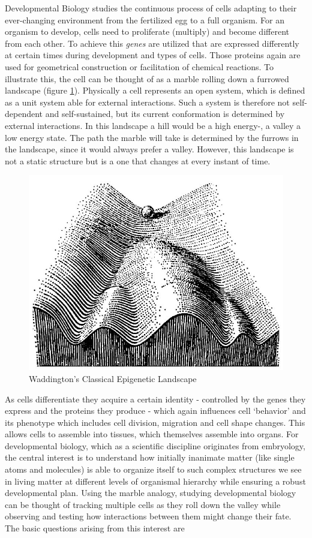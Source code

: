 \documentclass[11pt,singlespacinge,twoside]{reedthesis} %
\theoremstyle{definition}
\theoremstyle{definition}
\theoremstyle{definition}
\theoremstyle{remark}
\begin{document}
Developmental Biology studies the continuous process of cells adapting to their ever-changing environment from the fertilized egg to a full organism. For an organism to develop, cells need to proliferate (multiply) and become different from each other. To achieve this \emph{genes} are utilized that are expressed differently at certain times during development and types of cells. Those proteins again are used for geometrical construction or facilitation of chemical reactions. To illustrate this, the cell can be thought of as a marble rolling down a furrowed landscape (figure \ref{fig:wadd}). Physically a cell represents an open system, which is defined as a unit system able for external interactions. Such a system is therefore not self-dependent and self-sustained, but its current conformation is determined by external interactions. In this landscape a hill would be a high energy-, a valley a low energy state. The path the marble will take is determined by the furrows in the landscape, since it would always prefer a valley. However, this landscape is not a static structure but is a one that changes at every instant of time.
\begin{figure}[h]

{\centering \includegraphics[width=0.5\linewidth,]{figures/intro/waddington} 

}

\caption{Waddington's Classical Epigenetic Landscape}\label{fig:wadd}
\end{figure}
As cells differentiate they acquire a certain identity - controlled by the genes they express and the proteins they produce - which again influences cell `behavior' and its phenotype which includes cell division, migration and cell shape changes. This allows cells to assemble into tissues, which themselves assemble into organs. For developmental biology, which as a scientific discipline originates from embryology, the central interest is to understand how initially inanimate matter (like single atoms and molecules) is able to organize itself to such complex structures we see in living matter at different levels of organismal hierarchy while ensuring a robust developmental plan. Using the marble analogy, studying developmental biology can be thought of tracking multiple cells as they roll down the valley while observing and testing how interactions between them might change their fate. The basic questions arising from this interest are
\end{document}
